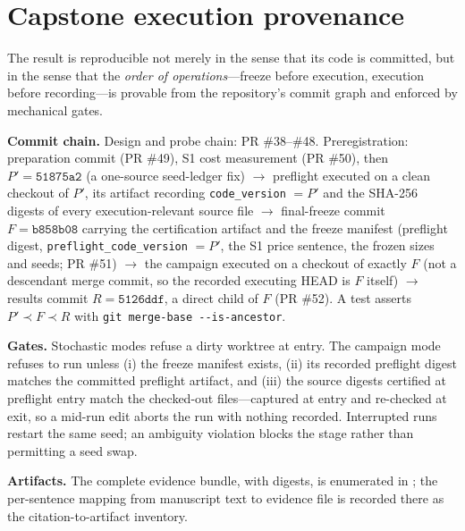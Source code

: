 \section{Capstone execution provenance}\label{app:provenance}

The  result is reproducible not merely in the sense
that its code is committed, but in the sense that the \emph{order of
operations}---freeze before execution, execution before recording---is
provable from the repository's commit graph and enforced by mechanical
gates.

\textbf{Commit chain.} Design and probe chain: PR \#38--\#48.
Preregistration: preparation commit (PR \#49), S1 cost measurement
(PR \#50), then $P' = \texttt{51875a2}$ (a one-source seed-ledger fix)
$\to$ preflight executed on a clean checkout of $P'$, its artifact
recording \texttt{code\_version} $= P'$ and the SHA-256 digests of every
execution-relevant source file $\to$ final-freeze commit
$F = \texttt{b858b08}$ carrying the certification artifact and the freeze
manifest (preflight digest, \texttt{preflight\_code\_version} $= P'$, the
S1 price sentence, the frozen sizes and seeds; PR \#51) $\to$ the
campaign executed on a checkout of exactly $F$ (not a descendant merge
commit, so the recorded executing HEAD is $F$ itself) $\to$ results
commit $R = \texttt{5126ddf}$, a direct child of $F$ (PR \#52). A test
asserts $P' \prec F \prec R$ with
\texttt{git merge-base -{}-is-ancestor}.

\textbf{Gates.} Stochastic modes refuse a dirty worktree at entry. The
campaign mode refuses to run unless (i) the freeze manifest exists,
(ii) its recorded preflight digest matches the committed preflight
artifact, and (iii) the source digests certified at preflight entry match
the checked-out files---captured at entry and re-checked at exit, so a
mid-run edit aborts the run with nothing recorded. Interrupted runs
restart the same seed; an ambiguity violation blocks the stage rather
than permitting a seed swap.

\textbf{Artifacts.} The complete  evidence bundle,
with digests, is enumerated in ; the
per-sentence mapping from manuscript text to evidence file is recorded
there as the citation-to-artifact inventory.

